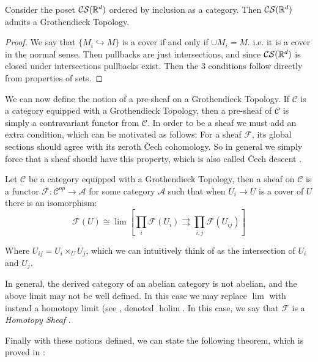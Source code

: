 \begin{theorem}
    Consider the poset \(\mathcal{CS}(\mathbb{R}^d)\) ordered by inclusion as a category. Then \(\mathcal{CS}(\mathbb{R}^d)\) admits a Grothendieck Topology.
\end{theorem}

\begin{proof}
    We say that \(\{M_i\hookrightarrow M\}\) is a cover if and only if \(\cup M_i = M\). i.e. it is a cover in the normal sense. Then pullbacks are just intersections, and since \(\mathcal{CS}(\mathbb{R}^d)\) is closed under intersections pullbacks exist. Then the 3 conditions follow directly from properties of sets. 
\end{proof}


We can now define the notion of a pre-sheaf on a Grothendieck Topology. If \(\mathcal C\) is a category equipped with a Grothendieck Topology, then a pre-sheaf of \(\mathcal{C}\) is simply a contravariant functor from \(\mathcal{C}\). In order to be a sheaf we must add an extra condition, which can be motivated as follows: For a sheaf \(\mathcal{F}\), its global sections should agree with its zeroth \v{C}ech cohomology. So in general we simply force that a sheaf should have this property, which is also called \v{C}ech descent \cite{Dugger2002HypercoversAS}.

\begin{definition}
    Let \(\mathcal C\) be a category equipped with a Grothendieck Topology, then a sheaf on \(\mathcal{C}\) is a functor \(\mathcal{F}:\mathcal{C}^{op}\rightarrow \mathcal{A}\) for some category \(\mathcal{A}\) such that when \({U_i\rightarrow U}\) is a cover of \(U\) there is an isomorphism:
    \[\mathcal{F}(U)\cong \lim\left[\prod_{i}\mathcal{F}(U_i) \rightrightarrows \prod_{i,j}\mathcal{F}(U_{ij}) \right]\]

    Where \(U_{ij}=U_i\times_UU_j\), which we can intuitively think of as the intersection of \(U_i\) and \(U_j\).
\end{definition}

In general, the derived category of an abelian category is not abelian, and the above limit may not be well defined. In this case we may replace \(\lim\) with instead a homotopy limit (see \cite{Lambrechts2013Holim}, denoted \(\operatorname{holim}\). In this case, we say that \(\mathcal{F}\) is a \textit{Homotopy Sheaf} \cite{Arya2022ShapeSpace}.

Finally with these notions defined, we can state the following theorem, which is proved in \cite{Arya2022ShapeSpace}:

